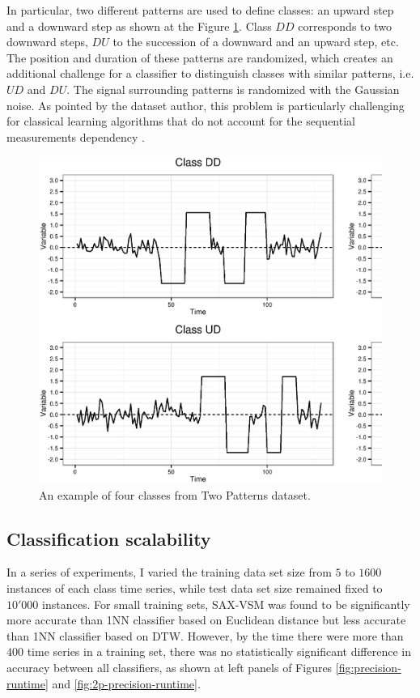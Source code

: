 In particular, two different patterns are used to define classes: an upward step and a downward step as 
shown at the Figure \ref{fig:2patterns}. Class $DD$ corresponds to two downward steps, $DU$ to the succession
of a downward and an upward step, etc. The position and duration of these patterns are randomized, 
which creates an additional challenge for a classifier to distinguish classes with similar patterns, i.e. $UD$ and $DU$.
The signal surrounding patterns is randomized with the Gaussian noise. 
As pointed by the dataset author, this problem is particularly challenging for classical learning 
algorithms that do not account for the sequential measurements dependency \cite{two_patterns}.

\begin{figure}[t]
   \centering
   \includegraphics[width=140mm]{figures/2patterns.ps}
   \caption{An example of four classes from Two Patterns dataset.}
   \label{fig:2patterns}
\end{figure}

\subsection{Classification scalability}
In a series of experiments, I varied the training data set size from $5$ to $1600$ instances of each class time series, 
while test data set size remained fixed to $10'000$ instances. 
For small training sets, SAX-VSM was found to be significantly more accurate than 1NN classifier based on Euclidean 
distance but less accurate than 1NN classifier based on DTW. 
However, by the time there were more than $400$ time series in a training set, there was no statistically 
significant difference in accuracy between all classifiers, 
as shown at left panels of Figures \ref{fig:precision-runtime} and \ref{fig:2p-precision-runtime}. 

